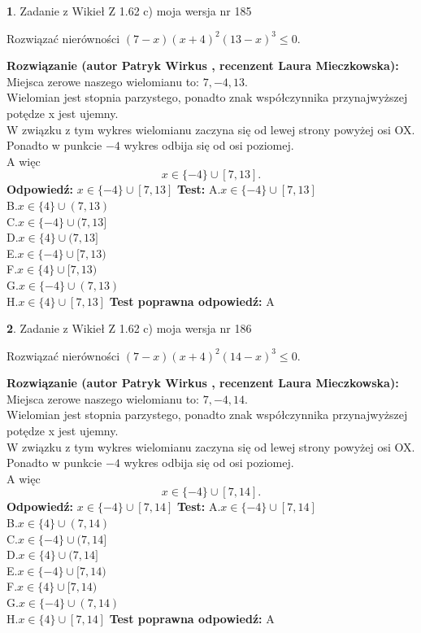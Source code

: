 \documentclass[12pt, a4paper]{article}
\theoremstyle{definition} %
\newtheorem{zad}{}
\newcommand{\zadStart}[1]{\begin{zad}#1\newline}
\newcommand{\zadStop}{\end{zad}}
\newcommand{\rozwStart}[2]{\noindent \textbf{Rozwiązanie (autor #1 , recenzent #2): }\newline}
\newcommand{\rozwStop}{\newline}
\newcommand{\odpStart}{\noindent \textbf{Odpowiedź:}\newline}
\newcommand{\odpStop}{\newline}
\newcommand{\testStart}{\noindent \textbf{Test:}\newline}
\newcommand{\testStop}{\newline}
\newcommand{\kluczStart}{\noindent \textbf{Test poprawna odpowiedź:}\newline}
\newcommand{\kluczStop}{\newline}
\begin{document}
\zadStart{Zadanie z Wikieł Z 1.62 c) moja wersja nr 185}

Rozwiązać nierówności $(7-x)(x+4)^{2}(13-x)^{3}\le0$.
\zadStop
\rozwStart{Patryk Wirkus}{Laura Mieczkowska}
Miejsca zerowe naszego wielomianu to: $7, -4, 13$.\\
Wielomian jest stopnia parzystego, ponadto znak współczynnika przy\linebreak najwyższej potędze x jest ujemny.\\ W związku z tym wykres wielomianu zaczyna się od lewej strony powyżej osi OX.\\
Ponadto w punkcie $-4$ wykres odbija się od osi poziomej.\\
A więc $$x \in \{-4\} \cup [7,13].$$
\rozwStop
\odpStart
$x \in \{-4\} \cup [7,13]$
\odpStop
\testStart
A.$x \in \{-4\} \cup [7,13]$\\
B.$x \in \{4\} \cup (7,13)$\\
C.$x \in \{-4\} \cup (7,13]$\\
D.$x \in \{4\} \cup (7,13]$\\
E.$x \in \{-4\} \cup [7,13)$\\
F.$x \in \{4\} \cup [7,13)$\\
G.$x \in \{-4\} \cup (7,13)$\\
H.$x \in \{4\} \cup [7,13]$
\testStop
\kluczStart
A
\kluczStop



\zadStart{Zadanie z Wikieł Z 1.62 c) moja wersja nr 186}

Rozwiązać nierówności $(7-x)(x+4)^{2}(14-x)^{3}\le0$.
\zadStop
\rozwStart{Patryk Wirkus}{Laura Mieczkowska}
Miejsca zerowe naszego wielomianu to: $7, -4, 14$.\\
Wielomian jest stopnia parzystego, ponadto znak współczynnika przy\linebreak najwyższej potędze x jest ujemny.\\ W związku z tym wykres wielomianu zaczyna się od lewej strony powyżej osi OX.\\
Ponadto w punkcie $-4$ wykres odbija się od osi poziomej.\\
A więc $$x \in \{-4\} \cup [7,14].$$
\rozwStop
\odpStart
$x \in \{-4\} \cup [7,14]$
\odpStop
\testStart
A.$x \in \{-4\} \cup [7,14]$\\
B.$x \in \{4\} \cup (7,14)$\\
C.$x \in \{-4\} \cup (7,14]$\\
D.$x \in \{4\} \cup (7,14]$\\
E.$x \in \{-4\} \cup [7,14)$\\
F.$x \in \{4\} \cup [7,14)$\\
G.$x \in \{-4\} \cup (7,14)$\\
H.$x \in \{4\} \cup [7,14]$
\testStop
\kluczStart
A
\kluczStop
\end{document}

